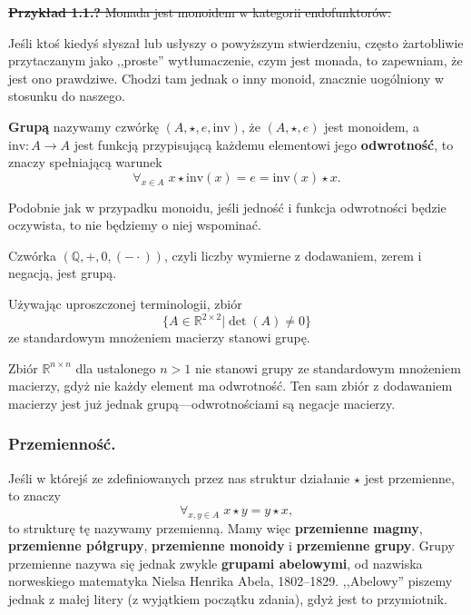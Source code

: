 \noindent\sout{
	\textbf{Przykład 1.1.?} Monada jest monoidem w kategorii endofunktorów.
}

Jeśli ktoś kiedyś słyszał lub usłyszy o powyższym stwierdzeniu,
	często żartobliwie przytaczanym jako ,,proste'' wytłumaczenie,
	czym jest monada, to zapewniam, że jest ono prawdziwe.
Chodzi tam jednak o inny monoid,
	znacznie uogólniony w stosunku do naszego.

\begin{definition}
    \textbf{Grupą} nazywamy czwórkę $(A, \star, e, \mathrm{inv})$,
		że $(A, \star, e)$ jest monoidem,
		a $\mathrm{inv}: A \to A$ jest funkcją przypisującą każdemu elementowi jego \textbf{odwrotność},
		to znaczy spełniającą warunek
	\begin{equation*}
		\forall_{x \in A}\; {x\star \mathrm{inv}(x) = e = \mathrm{inv}(x) \star x}.
	\end{equation*}
\end{definition}
Podobnie jak w przypadku monoidu,
	jeśli jedność i funkcja odwrotności będzie oczywista,
	to nie będziemy o niej wspominać.

\begin{example}
	Czwórka $(\mathbb{Q}, +, 0, (-\cdot))$, czyli liczby wymierne z dodawaniem, zerem i negacją, jest grupą.
\end{example}

\begin{example}
	Używając uproszczonej terminologii, zbiór
	\begin{equation}
		\{A \in \mathbb{R}^{2 \times 2} | \det(A) \neq 0 \}
	\end{equation}
		ze standardowym mnożeniem macierzy stanowi grupę.
\end{example}

\begin{example}
	Zbiór $\mathbb{R}^{n \times n}$ dla ustalonego $n > 1$ nie stanowi grupy
		ze standardowym mnożeniem macierzy,
		gdyż nie każdy element ma odwrotność.
	Ten sam zbiór z dodawaniem macierzy jest już jednak grupą---odwrotnościami są negacje macierzy.
\end{example}

\subsubsection{Przemienność.}
Jeśli w którejś ze zdefiniowanych przez nas struktur działanie $\star$ jest przemienne, to znaczy
\begin{equation}
	\forall_{x,y \in A}\; x \star y = y \star x,
\end{equation}
to strukturę tę nazywamy przemienną.
Mamy więc \textbf{przemienne magmy}, \textbf{przemienne półgrupy}, \textbf{przemienne monoidy} i \textbf{przemienne grupy}.
Grupy przemienne nazywa się jednak zwykle \textbf{grupami abelowymi},
od nazwiska norweskiego matematyka Nielsa Henrika Abela, 1802--1829.
,,Abelowy'' piszemy jednak z małej litery (z wyjątkiem początku zdania), gdyż jest to przymiotnik.

